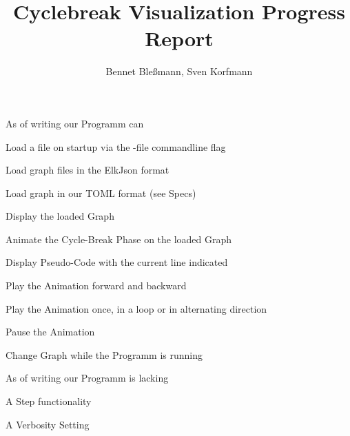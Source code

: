 \documentclass[12pt,a4paper]{article}
\author{Bennet Bleßmann, Sven Korfmann}
\title{Cyclebreak Visualization Progress Report}
\begin{document}
\maketitle

As of writing our Programm can
\begin{list}{-}{}
\item Load a file on startup via the -file commandline flag
\item Load graph files in the ElkJson format
\item Load graph in our TOML format (see Specs) 
\item Display the loaded Graph
\item Animate the Cycle-Break Phase on the loaded Graph
\item Display Pseudo-Code with the current line indicated
\item Play the Animation forward and backward
\item Play the Animation once, in a loop or in alternating direction
\item Pause the Animation
\item Change Graph while the Programm is running

\end{list}

As of writing our Programm is lacking
\begin{list}{-}{}
\item A Step functionality
\item A Verbosity Setting
\end{list}
\end{document}
